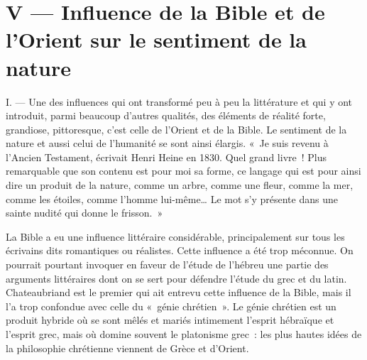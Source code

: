 \documentclass[french,twoside]{book} %
\begin{document}
\section[{V — Influence de la Bible et de l’Orient sur le sentiment de la nature}]{V — Influence de la Bible et de l’Orient sur le sentiment de la nature}
\noindent I. — Une des influences qui ont transformé peu à peu la littérature et qui y ont introduit, parmi beaucoup d’autres qualités, des éléments de réalité forte, grandiose, pittoresque, c’est celle de l’Orient et de la Bible. Le sentiment de la nature et aussi celui de l’humanité se sont ainsi élargis. « Je suis revenu à l’Ancien Testament, écrivait Henri Heine en 1830. Quel grand livre ! Plus remarquable que son contenu est pour moi sa forme, ce langage qui est pour ainsi dire un produit de la nature, comme un arbre, comme une fleur, comme la mer, comme les étoiles, comme l’homme lui-même… Le mot s’y présente dans une sainte nudité qui donne le frisson. »\par
La Bible a eu une influence littéraire considérable, principalement sur tous les écrivains dits romantiques ou réalistes. Cette influence a été trop méconnue. On pourrait pourtant invoquer en faveur de l’étude de l’hébreu une partie des arguments littéraires dont on se sert pour défendre l’étude du grec et du latin. Chateaubriand est le premier qui ait entrevu cette influence de la Bible, mais il l’a trop confondue avec celle du « génie chrétien ». Le génie chrétien est un produit hybride où se sont mêlés et mariés intimement l’esprit hébraïque et l’esprit grec, mais où domine souvent le platonisme grec : les plus hautes idées de la philosophie chrétienne viennent de Grèce et d’Orient.\par
\end{document}
